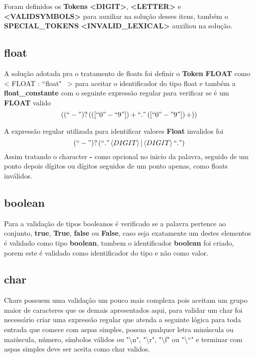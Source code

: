 \documentclass[
	article,			%
	11pt,				%
	oneside,			%
	a4paper,			%
	portuguese,			%
	brazil,				%
	sumario=tradicional
	]{abntex2}
\begin{document}
Foram definidos os \textbf{Tokens} \textbf{<DIGIT>}, \textbf{<LETTER>} e \textbf{<VALIDSYMBOLS>} para auxiliar na solução desses itens, também o \textbf{SPECIAL\_TOKENS} 
\textbf{<INVALID\_LEXICAL>} auxiliou na solução.

\subsection{float}

A solução adotada pra o tratamento de floats foi definir o \textbf{Token} \textbf{FLOAT} como < FLOAT : ``float" \ > para aceitar o identificador do tipo float e também a \textbf{float\_constante} com o seguinte expressão regular para verificar se é um \textbf{FLOAT} valido \[ \left( \left( ``-" \right)? \left( \left([``0"-``9"]\right)+ ``." \left([``0"-"9"]\right)+\right) \right) \]

A expressão regular utilizada para identificar valores \textbf{Float} invalidos foi \[ \left( ``-" \right)? \left( ``." \left<DIGIT\right> | \left<DIGIT\right> ``." \right) \]
Assim tratando o character \textbf{-} como opcional no inicio da palavra, seguido de um ponto depois dígitos ou dígitos seguidos de um ponto apenas, como floats inválidos.

\subsection{boolean}

Para a validação de tipos booleanos é verificado se a palavra pertence ao conjunto, \textbf{true}, \textbf{True}, \textbf{false} ou \textbf{False}, caso seja exatamente um destes elementos é validado como tipo \textbf{boolean}, tambem o identificador \textbf{boolean} foi criado, porem este é validado como identificador do tipo e não como valor.

\subsection{char}

Chars possuem uma validação um pouco mais complexa pois aceitam um grupo maior de caracteres que os demais apresentados aqui, para validar um char foi necessário criar uma expressão regular que atenda a seguinte lógica para toda entrada que comece com aspas simples, possua qualquer letra minúscula ou maiúscula, número, símbolos válidos ou 
"\textbackslash n", "\textbackslash r", "\textbackslash f" ou "\textbackslash ``" e terminar com aspas simples deve ser aceita como char validos.
\end{document}
